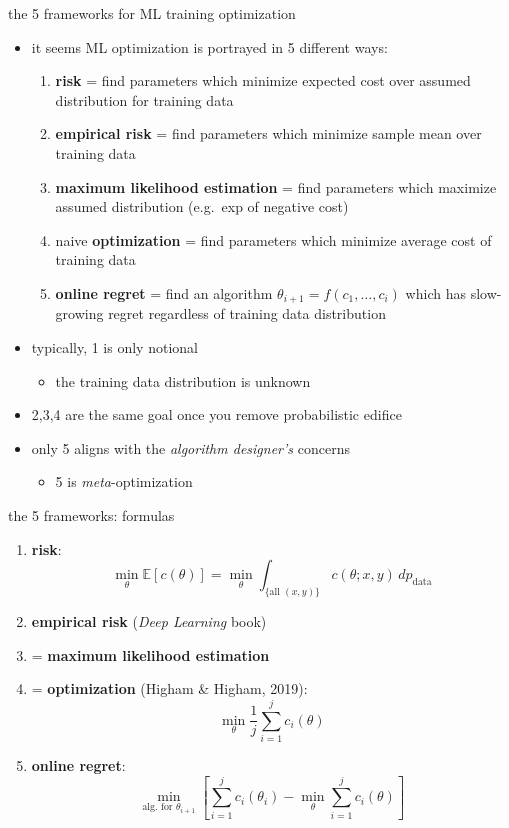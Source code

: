\documentclass[xcolor={svgnames},
               hyperref={colorlinks,citecolor=DeepPink4,linkcolor=FireBrick,urlcolor=Maroon},
               usepdftitle=false]  %
               {beamer}
\newcommand{\EE}{\mathbb{E}}
\begin{document}
\begin{frame}{the 5 frameworks for ML training optimization}

\begin{itemize}
\item it seems ML optimization is portrayed in 5 different ways:

\medskip
    \begin{enumerate}
    \item[1.] \textbf{risk} = find parameters which minimize expected cost over assumed distribution for training data
    \item[2.] \textbf{empirical risk} = find parameters which minimize sample mean over training data
    \item[3.] \textbf{maximum likelihood estimation} = find parameters which maximize assumed distribution (e.g.~exp of negative cost)
    \item[4.] naive \textbf{optimization} = find parameters which minimize average cost of training data
    \item[5.] \textbf{online regret} = find an algorithm $\theta_{i+1}=f(c_1,\dots,c_i)$ which has slow-growing regret regardless of training data distribution
    \end{enumerate}

\bigskip
\item typically, 1 is only notional
    \begin{itemize}
    \item[$-$] the training data distribution is unknown
    \end{itemize}
\item 2,3,4 are the same goal once you remove probabilistic edifice
\item only 5 aligns with the \emph{algorithm designer's} concerns
    \begin{itemize}
    \item[$-$] 5 is \emph{meta}-optimization
    \end{itemize}
\end{itemize}
\end{frame}


\begin{frame}{the 5 frameworks: formulas}

\begin{enumerate}
\item[1.] \textbf{risk}:
    $$\min_\theta \EE[c(\theta)] = \min_\theta \int_{\{\text{all } (x,y)\}} c(\theta;x,y)\,dp_{\text{data}}$$
\item[2.] \textbf{empirical risk} (\emph{Deep Learning} book)
\item[3.] = \textbf{maximum likelihood estimation}
\item[4.] = \textbf{optimization} (Higham \& Higham, 2019):
    $$\min_\theta \frac{1}{j} \sum_{i=1}^j c_i(\theta)$$
\item[5.] \textbf{online regret}:
    $$\min_{\text{alg.~for } \theta_{i+1}} \left[\sum_{i=1}^j c_i(\theta_i) - \min_\theta \sum_{i=1}^j c_i(\theta)\right]$$
\end{enumerate}
\end{frame}
\end{document}
